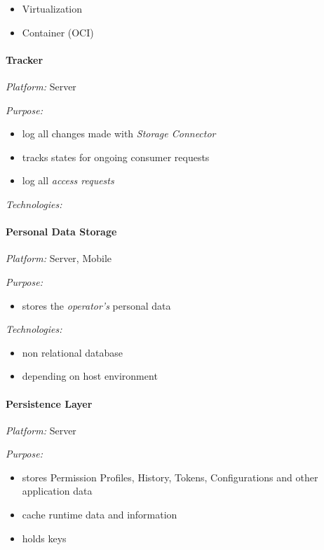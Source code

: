 \documentclass[12pt,english,a4paper,titlepage,cleardoublepage=empty,dottedtoc]{report}
\providecommand{\tightlist}{%
  \setlength{\itemsep}{0pt}\setlength{\parskip}{0pt}}
\begin{document}
\begin{itemize}
\tightlist
\item
  Virtualization
\item
  Container (OCI)
\end{itemize}

\paragraph{Tracker}\label{tracker}

\emph{Platform:} Server

\emph{Purpose:}

\begin{itemize}
\tightlist
\item
  log all changes made with \emph{Storage Connector}
\item
  tracks states for ongoing consumer requests
\item
  log all \emph{access requests}
\end{itemize}

\emph{Technologies:}

\paragraph{Personal Data Storage}\label{personal-data-storage}

\emph{Platform:} Server, Mobile

\emph{Purpose:}

\begin{itemize}
\tightlist
\item
  stores the \emph{operator's} personal data
\end{itemize}

\emph{Technologies:}

\begin{itemize}
\tightlist
\item
  non relational database
\item
  depending on host environment
\end{itemize}

\paragraph{Persistence Layer}\label{persistence-layer}

\emph{Platform:} Server

\emph{Purpose:}

\begin{itemize}
\tightlist
\item
  stores Permission Profiles, History, Tokens, Configurations and other
  application data
\item
  cache runtime data and information
\item
  holds keys
\end{itemize}
\end{document}
